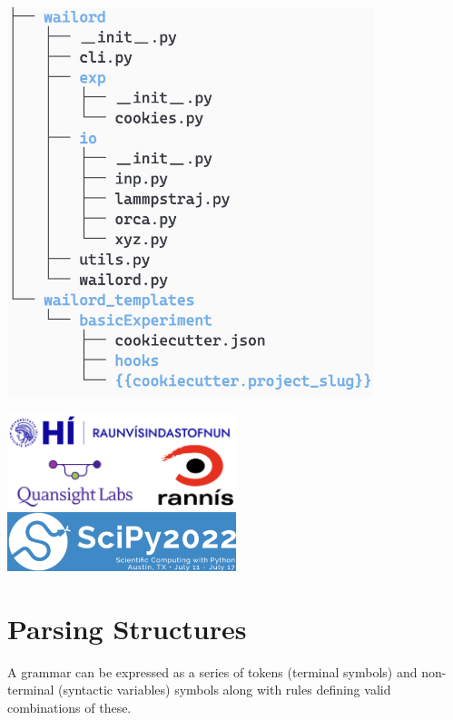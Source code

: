 \documentclass[a0paper,fleqn]{betterposter}
\begin{document}
{\includegraphics[width=0.8\textwidth]{img/wailordTreeStruct.png}


\vfill

\includegraphics[width=0.5\textwidth]{img/affilUIRannisQS.png}
\includegraphics[width=0.5\textwidth]{img/scipyLogo22.png}\\

}{

\section{Parsing Structures}
A grammar can be expressed as a series of tokens (terminal symbols) and
non-terminal (syntactic variables) symbols along with rules defining valid
combinations of these.

}
\end{document}
